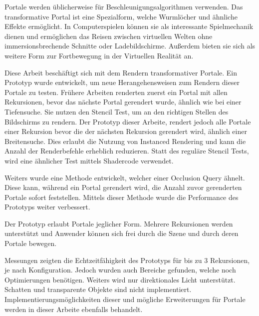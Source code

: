 
Portale werden üblicherweise für Beschleunigungsalgorithmen verwenden. Das transformative Portal ist eine Spezialform, welche Wurmlöcher und ähnliche Effekte ermöglicht. In Computerspielen können sie als interessante Spielmechanik dienen und ermöglichen das Reisen zwischen virtuellen Welten ohne immersionsbrechende Schnitte oder Ladebildschirme. Außerdem bieten sie sich als weitere Form zur Fortbewegung in der Virtuellen Realität an.

Diese Arbeit beschäftigt sich mit dem Rendern transformativer Portale. Ein Prototyp wurde entwickelt, um neue Herangehensweisen zum Rendern dieser Portale zu testen. Frühere Arbeiten renderten zuerst ein Portal mit allen Rekursionen, bevor das nächste Portal gerendert wurde, ähnlich wie bei einer Tiefensuche. Sie nutzen den Stencil Test, um an den richtigen Stellen des Bildschirms zu rendern.  Der Prototyp dieser Arbeite, rendert jedoch alle Portale einer Rekursion bevor die der nächsten Rekursion gerendert wird, ähnlich einer Breitensuche. Dies erlaubt die Nutzung von Instanced Rendering und kann die Anzahl der Renderbefehle erheblich reduzieren. Statt des reguläre Stencil Tests, wird eine ähnlicher Test mittels Shadercode verwendet.

Weiters wurde eine Methode entwickelt, welcher einer Occlusion Query ähnelt. Diese kann, während ein Portal gerendert wird, die Anzahl zuvor gerenderten Portale sofort feststellen. Mittels dieser Methode wurde die Performance des Prototyps weiter verbessert.

Der Prototyp erlaubt Portale jeglicher Form. Mehrere Rekursionen werden unterstützt und Anwender können sich frei durch die Szene und durch deren Portale bewegen.

Messungen zeigten die Echtzeitfähigkeit des Prototyps für bis zu 3 Rekursionen, je nach Konfiguration. Jedoch wurden auch Bereiche gefunden, welche noch Optimierungen benötigen. Weiters wird nur direktionales Licht unterstützt. Schatten und transparente Objekte sind nicht implementiert. Implementierungsmöglichkeiten dieser und mögliche Erweiterungen für Portale werden in dieser Arbeite ebenfalls behandelt.

